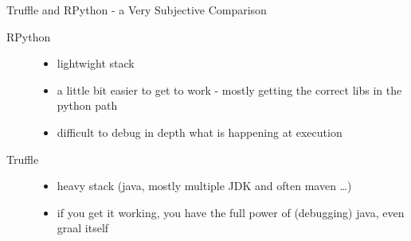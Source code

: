 \documentclass[xcolor=dvipsname,handout]{beamer} %
\begin{document}
\begin{frame}{Truffle and RPython - a Very Subjective Comparison}
\begin{description}
 \item[RPython] \begin{itemize}
  \item lightwight stack
  \item a little bit easier to get to work - mostly getting the correct libs in the python path
  \item difficult to debug in depth what is happening at execution
\end{itemize}
\item[Truffle] \begin{itemize}
  \item heavy stack (java, mostly multiple JDK and often maven \dots)
  \item if you get it working, you have the full power of (debugging) java, even graal itself
\end{itemize}
\end{description}
\end{frame}
\end{document}
